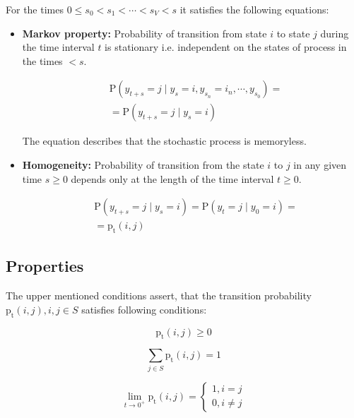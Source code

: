 \documentclass[thesis=M,english]{FITthesis}[2012/10/20]
\begin{document}
For the times $0 \leq s_0 < s_1 < \cdots < s_V < s$ it satisfies the following equations: 
\begin{itemize}
\item \textbf{Markov property:} Probability of transition from state $i$ to state $j$ during the time interval $t$ is stationary i.e. independent on the states of process in the times $< s$.  
    
\begin{equation}
\begin{aligned}
& \mathrm{P}( y_{t+s} = j \mid y_s = i, y_{s_n} = i_n, \cdots , y_{s_0} ) = \\ 
& = \mathrm{P}( y_{t+s} = j \mid y_s = i )
\end{aligned}
\end{equation}

The equation describes that the stochastic process is memoryless.

\item \textbf{Homogeneity:} Probability of transition from the state $i$ to $j$ in any given time $s \geq 0$ depends only at the length of the time interval $t \geq 0$. 

\begin{equation}
\begin{aligned}
& \mathrm{P}( y_{t+s} = j \mid y_s = i ) = \mathrm{P}( y_t = j \mid y_0 = i ) = \\
& = \mathrm{p_t}(i,j)
\end{aligned}
\end{equation}

\end{itemize}


\subsection{Properties} 

The upper mentioned conditions assert, that the transition probability $\mathrm{p_t}(i,j), i,j \in S$ satisfies following conditions:%


\begin{equation}
\mathrm{p_t}(i,j) \geq 0
\end{equation}

\begin{equation}
\sum_{j \in S} \mathrm{p_t}(i,j) = 1
\end{equation}

\begin{equation}\label{eq:l0}  
\lim_{t \to 0^+} \mathrm{p_t}(i,j)= 
\begin{cases}
1, i = j\\
0, i \neq j
\end{cases}
\end{equation}
\end{document}
